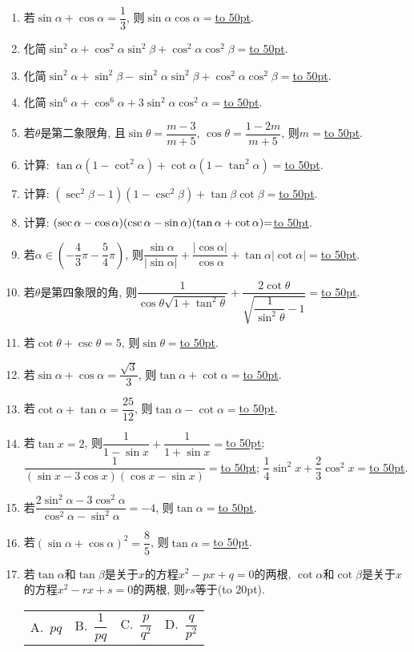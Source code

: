 \documentclass[10pt,a4paper]{article}
\newcommand{\blank}[1]{\underline{\hbox to #1pt{}}}
\newcommand{\bracket}[1]{(\hbox to #1pt{})}
\newcommand{\fourch}[4]{\par\begin{tabular}{p{.23\textwidth}p{.23\textwidth}p{.23\textwidth}p{.23\textwidth}}
A.~#1 &B.~#2& C.~#3& D.~#4
\end{tabular}}
\begin{document}
\begin{enumerate}[1.]
\item 若$\sin \alpha +\cos \alpha =\dfrac 13$, 则$\sin \alpha \cos \alpha =$\blank{50}.
\item 化简$\sin ^2\alpha +\cos ^2\alpha \sin ^2\beta +\cos ^2\alpha \cos ^2\beta =$\blank{50}.
\item 化简$\sin ^2\alpha +\sin ^2\beta -\sin ^2\alpha \sin ^2\beta +\cos ^2\alpha \cos ^2\beta =$\blank{50}.
\item 化简$\sin ^6\alpha +\cos ^6\alpha +3\sin ^2\alpha \cos ^2\alpha =$\blank{50}.
\item 若$\theta$是第二象限角, 且$\sin \theta =\dfrac{m-3}{m+5}$, $\cos \theta =\dfrac{1-2m}{m+5}$, 则$m=$\blank{50}.
\item 计算: $\tan \alpha (1-\cot ^2\alpha)+\cot \alpha (1-\tan ^2\alpha)=$\blank{50}.
\item 计算: $(\sec ^2\beta -1)(1-\csc ^2\beta)+\tan \beta \cot \beta =$\blank{50}.
\item 计算: $(\sec \alpha -\cos \alpha)(\csc \alpha -\sin \alpha)(\tan \alpha +\cot \alpha)\text=$\blank{50}.
\item 若$\alpha \in (-\dfrac 43\pi -\dfrac 54\pi)$, 则$\dfrac{\sin \alpha}{|\sin \alpha|}+\dfrac{|\cos \alpha|}{\cos \alpha}+\tan \alpha|\cot \alpha|=$\blank{50}.
\item 若$\theta$是第四象限的角, 则$\dfrac 1{\cos \theta \sqrt {1+\tan ^2\theta}}+\dfrac{2\cot \theta}{\sqrt {\dfrac 1{\sin ^2\theta}-1}}=$\blank{50}.
\item 若$\cot \theta +\csc \theta =5$, 则$\sin \theta =$\blank{50}.
\item 若$\sin \alpha +\cos \alpha =\dfrac{\sqrt 3}3$, 则$\tan \alpha +\cot \alpha =$\blank{50}.
\item 若$\cot \alpha +\tan \alpha =\dfrac{25}{12}$, 则$\tan \alpha -\cot \alpha =$\blank{50}.
\item 若$\tan x=2$, 则$\dfrac 1{1-\sin x}+\dfrac 1{1+\sin x}=$\blank{50}; $\dfrac 1{(\sin x-3\cos x)(\cos x-\sin x)}=$\blank{50}; $\dfrac 14\sin ^2x+\dfrac 23\cos ^2x=$\blank{50}.
\item 若$\dfrac{2\sin ^2\alpha -3\cos ^2\alpha}{\cos ^2\alpha -\sin ^2\alpha}=-4$, 则$\tan \alpha =$\blank{50}.
\item 若$(\sin \alpha +\cos \alpha)^2=\dfrac 85$, 则$\tan \alpha =$\blank{50}.
\item 若$\tan \alpha$和$\tan \beta$是关于$x$的方程$x^2-px+q=0$的两根, $\cot \alpha$和$\cot \beta$是关于$x$的方程$x^2-rx+s=0$的两根, 则$rs$等于\bracket{20}.
\fourch{$pq$}{$\dfrac 1{pq}$}{$\dfrac p{q^2}$}{$\dfrac q{p^2}$}

\end{enumerate}
\end{document}

